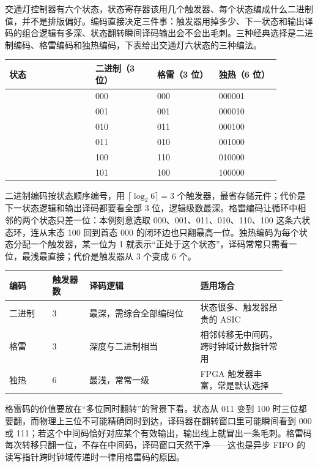 
交通灯控制器有六个状态，状态寄存器该用几个触发器、每个状态编成什么二进制值，并不是排版偏好。编码直接决定三件事：触发器用掉多少、下一状态和输出译码的组合逻辑有多深、状态翻转瞬间译码输出会不会出毛刺。三种经典选择是二进制编码、格雷编码和独热编码，下表给出交通灯六状态的三种编法。

\begin{longtable}{L{0.28\linewidth}L{0.2\linewidth}L{0.2\linewidth}L{0.2\linewidth}}
\toprule
状态 & 二进制（3 位） & 格雷（3 位） & 独热（6 位） \\
\midrule
{} & 000 & 000 & 000001 \\\tablerowrule
{} & 001 & 001 & 000010 \\\tablerowrule
{} & 010 & 011 & 000100 \\\tablerowrule
{} & 011 & 010 & 001000 \\\tablerowrule
{} & 100 & 110 & 010000 \\\tablerowrule
{} & 101 & 100 & 100000 \\
\bottomrule
\end{longtable}

二进制编码按状态顺序编号，用 $\lceil\log_2 6\rceil=3$ 个触发器，最省存储元件；代价是下一状态逻辑和输出译码都要看全部 3 位，逻辑级数最深。格雷编码让循环中相邻的两个状态只差一位：本例刻意选取 000、001、011、010、110、100 这条六状态环，连从末态 100 回到首态 000 的闭环边也只翻最高一位。独热编码为每个状态分配一个触发器，某一位为 1 就表示“正处于这个状态”，译码常常只需看一位，最浅最直接；代价是触发器从 3 个变成 6 个。

\begin{longtable}{L{0.14\linewidth}L{0.12\linewidth}L{0.36\linewidth}L{0.28\linewidth}}
\toprule
编码 & 触发器数 & 译码逻辑 & 适用场合 \\
\midrule
二进制 & 3 & 最深，需综合全部编码位 & 状态很多、触发器昂贵的 ASIC \\\tablerowrule
格雷 & 3 & 深度与二进制相当 & 相邻转移无中间码，跨时钟域计数指针常用 \\\tablerowrule
独热 & 6 & 最浅，常常一级 & FPGA 触发器丰富，常是默认选择 \\
\bottomrule
\end{longtable}

格雷码的价值要放在“多位同时翻转”的背景下看。状态从 011 变到 100 时三位都要翻，而物理上三位不可能精确同时到达，译码器在翻转窗口里可能瞬间看到 000 或 111；若这个中间码恰好对应某个有效输出，输出线上就冒出一条毛刺。格雷码每次转移只翻一位，不存在中间码，译码窗口天然干净——这也是异步 FIFO 的读写指针跨时钟域传递时一律用格雷码的原因。

